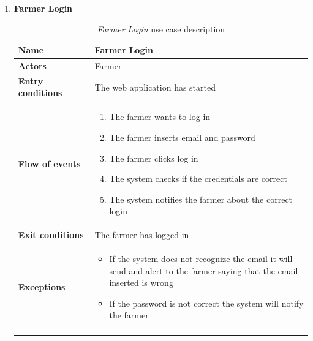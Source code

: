 \begin{enumerate}
    \item \textbf{Farmer Login}
        \begin{longtable}{p{0.26\linewidth}p{0.75\linewidth}}
            \toprule
            \textbf{Name} & \textbf{Farmer Login} \\
            \midrule
            \textbf{Actors} & Farmer \\
            \midrule
            \textbf{Entry conditions} & The web application has started\\
            \midrule
            \textbf{Flow of events} & 
            \begin{enumerate}
                \item The farmer wants to log in
                \item The farmer inserts email and password
                \item The farmer clicks log in
                \item The system checks if the credentials are correct
                \item The system notifies the farmer about the correct login
            \end{enumerate} \\
            \midrule
            \textbf{Exit conditions} & The farmer has logged in\\
            \midrule
            \textbf{Exceptions} & 
            \begin{itemize}
                \item If the system does not recognize the email it will send and alert to the farmer saying that the email inserted is wrong
                \item If the password is not correct the system will notify the farmer
            \end{itemize} \\
            \bottomrule
            \caption{\emph{Farmer Login} use case description}
        \end{longtable}
        

\end{enumerate}
